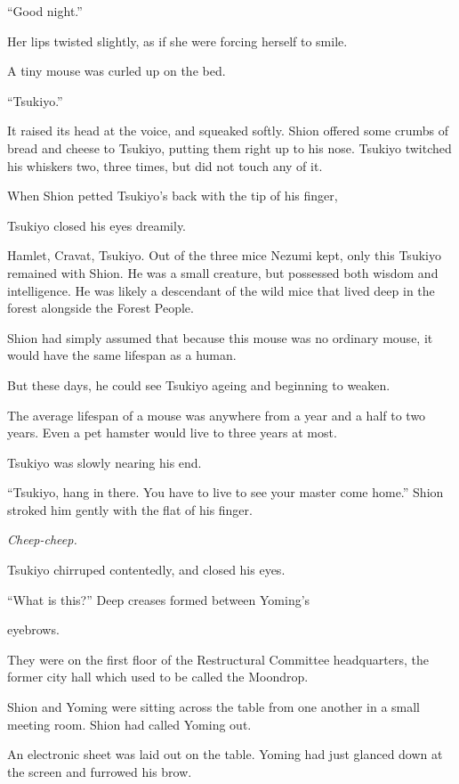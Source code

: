 ``Good night.''

Her lips twisted slightly, as if she were forcing herself to smile.

\myspace

A tiny mouse was curled up on the bed.

``Tsukiyo.''

It raised its head at the voice, and squeaked softly. Shion offered some
crumbs of bread and cheese to Tsukiyo, putting them right up to his
nose. Tsukiyo twitched his whiskers two, three times, but did not touch
any of it.

When Shion petted Tsukiyo's back with the tip of his finger,~

Tsukiyo closed his eyes dreamily.

Hamlet, Cravat, Tsukiyo. Out of the three mice Nezumi kept, only this
Tsukiyo remained with Shion. He was a small creature, but possessed both
wisdom and intelligence. He was likely a descendant of the wild mice
that lived deep in the forest alongside the Forest People.

Shion had simply assumed that because this mouse was no ordinary mouse,
it would have the same lifespan as a human.~

But these days, he could see Tsukiyo ageing and beginning to weaken.

The average lifespan of a mouse was anywhere from a year and a half to
two years. Even a pet hamster would live to three years at most.

Tsukiyo was slowly nearing his end.

``Tsukiyo, hang in there. You have to live to see your master come
home.'' Shion stroked him gently with the flat of his finger.

\emph{Cheep-cheep.}

Tsukiyo chirruped contentedly, and closed his eyes.

\mybreak

``What is this?'' Deep creases formed between Yoming's~

eyebrows.

They were on the first floor of the Restructural Committee headquarters,
the former city hall which used to be called the Moondrop.

Shion and Yoming were sitting across the table from one another in a
small meeting room. Shion had called Yoming out.~

An electronic sheet was laid out on the table. Yoming had just glanced
down at the screen and furrowed his brow.

